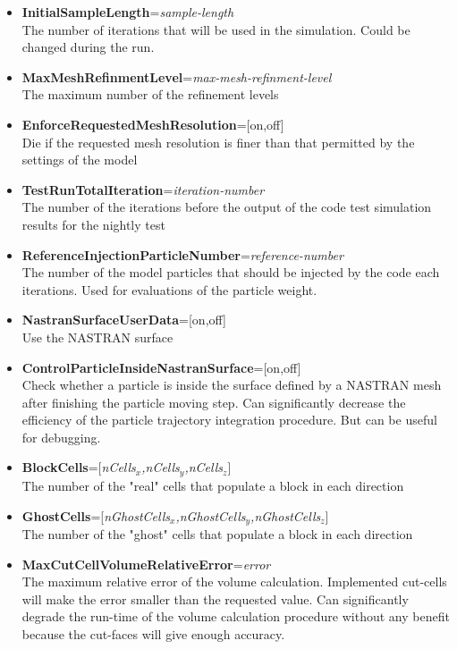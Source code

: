 \begin{itemize}
\item {\bf InitialSampleLength}={\it sample-length} \\ The number of iterations that will be used in the simulation. Could be changed during the run.

\item {\bf MaxMeshRefinmentLevel}={\it max-mesh-refinment-level} \\ The maximum number of the refinement levels

\item {\bf EnforceRequestedMeshResolution}=[on,off] \\ Die if the requested mesh resolution is finer than that permitted by the settings of the model

\item {\bf TestRunTotalIteration}={\it iteration-number} \\ The number of the iterations before the output of the code test simulation results for the nightly test

\item {\bf ReferenceInjectionParticleNumber}={\it reference-number} \\ The number of the model particles that should be injected by the code each iterations. Used for evaluations of the particle weight.

\item {\bf NastranSurfaceUserData}=[on,off] \\ Use the NASTRAN surface 

\item {\bf ControlParticleInsideNastranSurface}=[on,off] \\ Check whether a particle is inside the surface defined by a NASTRAN mesh after finishing the particle moving step. Can significantly decrease the efficiency of the particle trajectory integration procedure. But can be useful for debugging. 

\item {\bf BlockCells}=[{\it nCells$_x$,nCells$_y$,nCells$_z$}] \\ The number of the "real" cells that populate a block in each direction

\item {\bf GhostCells}=[{\it nGhostCells$_x$,nGhostCells$_y$,nGhostCells$_z$}] \\ The number of the "ghost" cells that populate a block in each direction

\item {\bf MaxCutCellVolumeRelativeError}={\it error} \\ The maximum relative error of the volume calculation. Implemented cut-cells will make the error smaller than the requested value. Can significantly degrade the run-time of the volume calculation procedure without any benefit because the cut-faces will give enough accuracy. 


\end{itemize}

